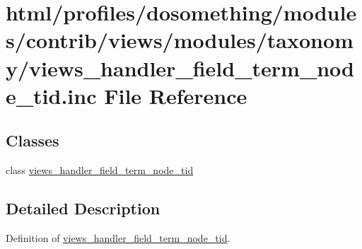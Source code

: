 \hypertarget{views__handler__field__term__node__tid_8inc}{
\section{html/profiles/dosomething/modules/contrib/views/modules/taxonomy/views\_\-handler\_\-field\_\-term\_\-node\_\-tid.inc File Reference}
\label{views__handler__field__term__node__tid_8inc}
}
\subsection*{Classes}
\begin{DoxyCompactItemize}
\item 
class \hyperlink{classviews__handler__field__term__node__tid}{views\_\-handler\_\-field\_\-term\_\-node\_\-tid}
\end{DoxyCompactItemize}


\subsection{Detailed Description}
Definition of \hyperlink{classviews__handler__field__term__node__tid}{views\_\-handler\_\-field\_\-term\_\-node\_\-tid}. 